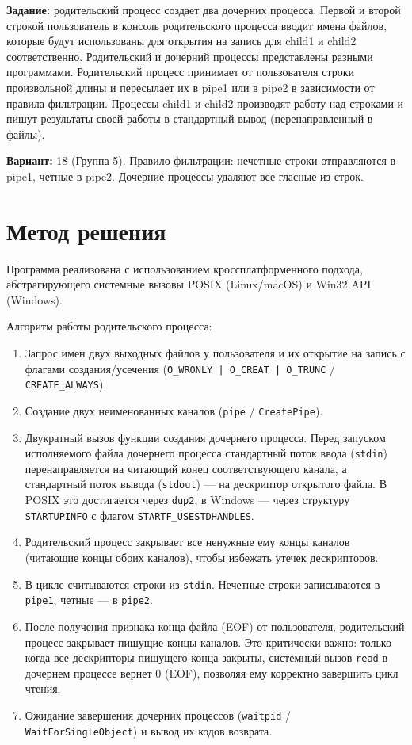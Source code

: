 \documentclass[pdf, unicode, 12pt, a4paper, oneside, fleqn]{article}
\begin{document}
{\bfseries Задание:} родительский процесс создает два дочерних процесса. Первой и второй строкой пользователь в консоль родительского процесса вводит имена файлов, которые будут использованы для открытия на запись для child1 и child2 соответственно. Родительский и дочерний процессы представлены разными программами. Родительский процесс принимает от пользователя строки произвольной длины и пересылает их в pipe1 или в pipe2 в зависимости от правила фильтрации. Процессы child1 и child2 производят работу над строками и пишут результаты своей работы в стандартный вывод (перенаправленный в файлы).

{\bfseries Вариант:} 18 (Группа 5). Правило фильтрации: нечетные строки отправляются в pipe1, четные в pipe2. Дочерние процессы удаляют все гласные из строк.

\pagebreak

\section{Метод решения}
Программа реализована с использованием кроссплатформенного подхода, абстрагирующего системные вызовы POSIX (Linux/macOS) и Win32 API (Windows). 

Алгоритм работы родительского процесса:
\begin{enumerate}
    \item Запрос имен двух выходных файлов у пользователя и их открытие на запись с флагами создания/усечения (\texttt{O\_WRONLY | O\_CREAT | O\_TRUNC} / \texttt{CREATE\_ALWAYS}).
    \item Создание двух неименованных каналов (\texttt{pipe} / \texttt{CreatePipe}).
    \item Двукратный вызов функции создания дочернего процесса. Перед запуском исполняемого файла дочернего процесса стандартный поток ввода (\texttt{stdin}) перенаправляется на читающий конец соответствующего канала, а стандартный поток вывода (\texttt{stdout}) — на дескриптор открытого файла. В POSIX это достигается через \texttt{dup2}, в Windows — через структуру \texttt{STARTUPINFO} с флагом \texttt{STARTF\_USESTDHANDLES}.
    \item Родительский процесс закрывает все ненужные ему концы каналов (читающие концы обоих каналов), чтобы избежать утечек дескрипторов.
    \item В цикле считываются строки из \texttt{stdin}. Нечетные строки записываются в \texttt{pipe1}, четные — в \texttt{pipe2}.
    \item После получения признака конца файла (EOF) от пользователя, родительский процесс закрывает пишущие концы каналов. Это критически важно: только когда все дескрипторы пишущего конца закрыты, системный вызов \texttt{read} в дочернем процессе вернет 0 (EOF), позволяя ему корректно завершить цикл чтения.
    \item Ожидание завершения дочерних процессов (\texttt{waitpid} / \texttt{WaitForSingleObject}) и вывод их кодов возврата.
\end{enumerate}
\end{document}
